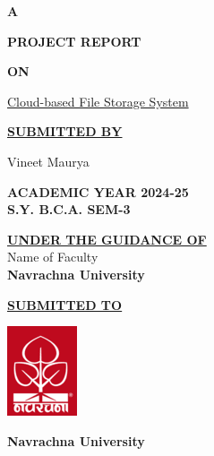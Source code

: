 \documentclass[a4paper]{report}
\begin{document}
\begin{center}
    \textbf{\LARGE{A\\ }}

    \textbf{\LARGE{PROJECT REPORT}}

    \textbf{\LARGE{ON}}

    \Large{\underline{Cloud-based File Storage System}}
    \vspace{1cm}

    \textbf{\underline{SUBMITTED BY}}

    Vineet Maurya
    \vspace{1cm}

    \textbf{ACADEMIC YEAR 2024-25\\
        S.Y. B.C.A. SEM-3}
    \vspace{1cm}

    \textbf{\underline{UNDER THE GUIDANCE OF}}\\
    Name of Faculty\\
    \textbf{Navrachna University}
    \vspace{1cm}

    \textbf{\underline{SUBMITTED TO}}
    \vspace{0.5cm}

    \includegraphics{nuv_logo.png}
    \vspace{0.5cm}

    \textbf{Navrachna University}
\end{center}
\end{document}

